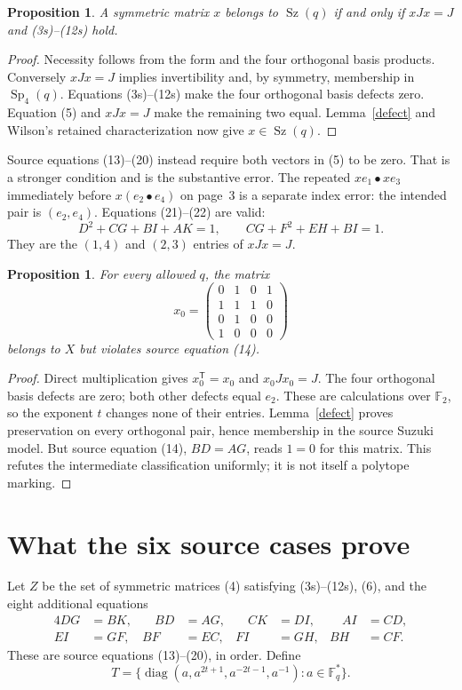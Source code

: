 \documentclass[11pt,a4paper]{article}
\newtheorem{proposition}[theorem]{Proposition}
\newcommand{\Sz}{\operatorname{Sz}}
\newcommand{\Sp}{\operatorname{Sp}}
\newcommand{\F}{\mathbb F}
\begin{document}
\begin{proposition}\label{criterion}
A symmetric matrix $x$ belongs to $\Sz(q)$ if and only if
$xJx=J$ and (3s)--(12s) hold.
\end{proposition}
\begin{proof}
Necessity follows from the form and the four orthogonal basis
products. Conversely $xJx=J$ implies invertibility and, by symmetry,
membership in $\Sp_4(q)$. Equations (3s)--(12s) make the four
orthogonal basis defects zero. Equation (5) and $xJx=J$ make the
remaining two equal. Lemma~\ref{defect} and Wilson's retained
characterization now give $x\in\Sz(q)$.
\end{proof}

Source equations (13)--(20) instead require both vectors in (5)
to be zero. That is a stronger condition and is the substantive
error. The repeated $xe_1\bullet xe_3$ immediately before
$x(e_2\bullet e_4)$ on page~3 is a separate index error: the
intended pair is $(e_2,e_4)$. Equations (21)--(22) are valid:
\[
 D^2+CG+BI+AK=1,\qquad CG+F^2+EH+BI=1.
 \tag{6}
\]
They are the $(1,4)$ and $(2,3)$ entries of $xJx=J$.

\begin{proposition}\label{binary}
For every allowed $q$, the matrix
\[
 x_0=\begin{pmatrix}
 0&1&0&1\\1&1&1&0\\0&1&0&0\\1&0&0&0
 \end{pmatrix}
 \tag{7}
\]
belongs to $X$ but violates source equation (14).
\end{proposition}
\begin{proof}
Direct multiplication gives $x_0^{\mathsf T}=x_0$ and
$x_0Jx_0=J$. The four orthogonal basis defects are zero; both
other defects equal $e_2$. These are calculations over $\F_2$,
so the exponent $t$ changes none of their entries. Lemma~\ref{defect}
proves preservation on every orthogonal pair, hence membership in
the source Suzuki model. But source equation (14), $BD=AG$, reads
$1=0$ for this matrix. This refutes the intermediate classification
uniformly; it is not itself a polytope marking.
\end{proof}

\section{What the six source cases prove}
Let $Z$ be the set of symmetric matrices (4) satisfying (3s)--(12s),
(6), and the eight additional equations
\begin{alignat*}{4}
 DG&=BK,&\quad BD&=AG,&\quad CK&=DI,&\quad AI&=CD,\\
 EI&=GF,& BF&=EC,& FI&=GH,& BH&=CF.
\end{alignat*}
These are source equations (13)--(20), in order. Define
\[
 T=\{\operatorname{diag}(a,a^{2t+1},a^{-2t-1},a^{-1}):
 a\in\F_q^*\}.
 \tag{8}
\]
\end{document}
